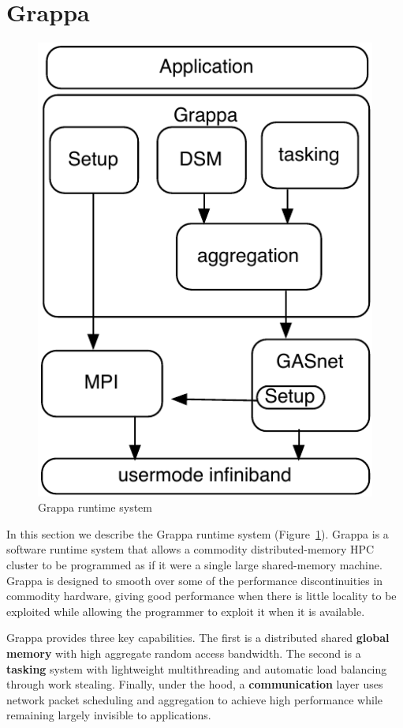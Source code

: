 \section{Grappa} \label{sec:grappa}

\begin{figure}[t]
\begin{center}
  \includegraphics[width=0.5\columnwidth]{figs/grappa-crappy}
\begin{minipage}{0.95\columnwidth}
  \caption{\label{fig:grappa} Grappa runtime system \vspace{-4ex}}
\end{minipage}
\vspace{-3ex}
\end{center}
\end{figure}

In this section we describe the Grappa runtime system
(Figure~\ref{fig:grappa}). Grappa is a software runtime system that
allows a commodity distributed-memory HPC cluster to be programmed as
if it were a single large shared-memory machine. Grappa is designed to
smooth over some of the performance discontinuities in commodity
hardware, giving good performance when there is little locality to be
exploited while allowing the programmer to exploit it when it is
available.

Grappa provides three key capabilities. The first is a distributed
shared \textbf{global memory} with high aggregate random access
bandwidth. The second is a \textbf{tasking} system with lightweight
multithreading and automatic load balancing through work
stealing. Finally, under the hood, a \textbf{communication} layer uses
network packet scheduling and aggregation to achieve high performance
while remaining largely invisible to applications.

